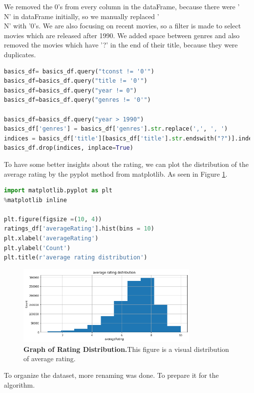 We removed the 0's from every column in the dataFrame, because there were '\\N' in dataFrame initially, so we manually replaced '\\N' with '0's. We are also focusing on recent movies, so a filter is made to select movies which are released after 1990. We added space between genres and also removed the movies which have '?' in the end of their title, because they were duplicates.

\begin{lstlisting}[language=python]
basics_df= basics_df.query("tconst != '0'")
basics_df=basics_df.query("title != '0'")
basics_df=basics_df.query("year != 0")
basics_df=basics_df.query("genres != '0'")

basics_df=basics_df.query("year > 1990")
basics_df['genres'] = basics_df['genres'].str.replace(',', ', ')
indices = basics_df['title'][basics_df['title'].str.endswith("?")].index
basics_df.drop(indices, inplace=True)
\end{lstlisting}

To have some better insights about the rating, we can plot the distribution of the average rating by the pyplot method from matplotlib.  As seen in Figure \ref{fig:graph}.

\begin{lstlisting}[language=python]
import matplotlib.pyplot as plt
%matplotlib inline

plt.figure(figsize =(10, 4))   
ratings_df['averageRating'].hist(bins = 10)
plt.xlabel('averageRating')
plt.ylabel('Count')
plt.title(r'average rating distribution')
\end{lstlisting}

\begin{figure}[ht]
	\centering
  	\includegraphics[width=0.8\textwidth]{images/graph.png}
	\caption{\textbf{Graph of Rating Distribution.}This figure is a visual distribution of average rating.}
  	\label{fig:graph}
\end{figure}


To organize the dataset, more renaming was done. To prepare it for the algorithm.

